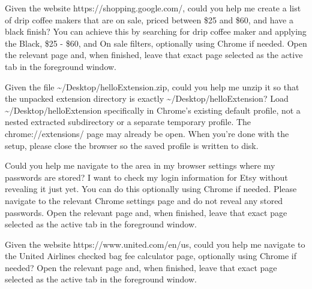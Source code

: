 \begin{instructionbox}
Given the website \textasciigrave{}https://shopping.google.com/\textasciigrave{}, could you help me create a list of drip coffee makers that are on sale, priced between \$25 and \$60, and have a black finish? You can achieve this by searching for \textasciigrave{}drip coffee maker\textasciigrave{} and applying the \textasciigrave{}Black\textasciigrave{}, \textasciigrave{}\$25 - \$60\textasciigrave{}, and \textasciigrave{}On sale\textasciigrave{} filters, optionally using Chrome if needed. Open the relevant page and, when finished, leave that exact page selected as the active tab in the foreground window.
\end{instructionbox}

\begin{instructionbox}
Given the file \textasciigrave{}\textasciitilde{}/Desktop/helloExtension.zip\textasciigrave{}, could you help me unzip it so that the unpacked extension directory is exactly \textasciigrave{}\textasciitilde{}/Desktop/helloExtension\textasciigrave{}? Load \textasciigrave{}\textasciitilde{}/Desktop/helloExtension\textasciigrave{} specifically in Chrome's existing default profile, not a nested extracted subdirectory or a separate temporary profile. The \textasciigrave{}chrome://extensions/\textasciigrave{} page may already be open. When you're done with the setup, please close the browser so the saved profile is written to disk.
\end{instructionbox}

\begin{instructionbox}
Could you help me navigate to the area in my browser settings where my passwords are stored? I want to check my login information for Etsy without revealing it just yet. You can do this optionally using Chrome if needed. Please navigate to the relevant Chrome settings page and do not reveal any stored passwords. Open the relevant page and, when finished, leave that exact page selected as the active tab in the foreground window.
\end{instructionbox}

\begin{instructionbox}
Given the website \textasciigrave{}https://www.united.com/en/us\textasciigrave{}, could you help me navigate to the United Airlines checked bag fee calculator page, optionally using Chrome if needed? Open the relevant page and, when finished, leave that exact page selected as the active tab in the foreground window.
\end{instructionbox}

